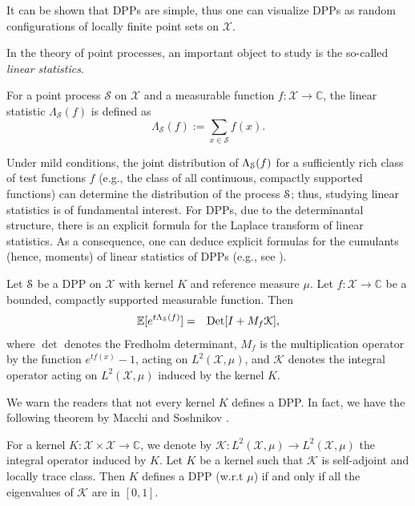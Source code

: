 \begin{remark}
    It can be shown that DPPs are simple, thus one can visualize DPPs as random configurations of locally finite point sets on $\mathcal X$. 
\end{remark}

In the theory of point processes, an important object to study is the so-called \emph{linear statistics}.
\begin{definition}
    For a point process $\mathcal S$ on $\mathcal X$ and a measurable function $f: \mathcal X \rightarrow \mathbb C$, the linear statistic $\Lambda_{\mathcal S}(f)$ is defined as
\[\Lambda_{\mathcal S}(f) := \sum_{x\in \mathcal S} f(x).\]
\end{definition}
Under mild conditions, the joint distribution of $\Lambda_{\mathcal{S}}(f)$ for a sufficiently rich class of test functions $f$ (e.g., the class of all continuous, compactly supported functions) can determine the distribution of the process $\mathcal{S}$; thus, studying linear statistics is of fundamental interest. For DPPs, due to the determinantal structure, there is an explicit formula for the Laplace transform of linear statistics. As a consequence, one can deduce explicit formulas for the cumulants (hence, moments) of linear statistics of DPPs (e.g., see \cite{lambertdpps}).
\begin{proposition}
    Let $\mathcal{S}$ be a DPP on $\mathcal X$ with kernel $K$ and reference measure $\mu$. Let $f:\mathcal X \rightarrow \mathbb C$ be a bounded, compactly supported measurable function. Then
    \begin{eqnarray*}
        \mathbb E[e^{t\Lambda_{\mathcal{S}}(f)}] &=& \mathrm{Det}[I + M_f \mathcal K],
    \end{eqnarray*}
    where $\det$ denotes the Fredholm determinant, $M_f$ is the multiplication operator by the function $e^{tf(x)}-1$, acting on $L^2(\mathcal X,\mu)$, and $\mathcal K$ denotes the integral operator acting on $L^2(\mathcal X,\mu)$ induced by the kernel $K$.
\end{proposition}

We warn the readers that not every kernel $K$ defines a DPP. In fact, we have the following theorem by Macchi \cite{Mac75} and Soshnikov \cite{SoshDPP}.

\begin{theorem}
    For a kernel $K: \mathcal X \times \mathcal X \rightarrow\mathbb C$, we denote by $\mathcal K: L^2(\mathcal X,\mu) \rightarrow L^2(\mathcal X, \mu)$ the integral operator induced by $K$. Let $K$ be a kernel such that $\mathcal K$ is self-adjoint and locally trace class. Then $K$ defines a DPP (w.r.t $\mu$) if and only if all the eigenvalues of $\mathcal K$ are in $[0,1]$.
\end{theorem}

